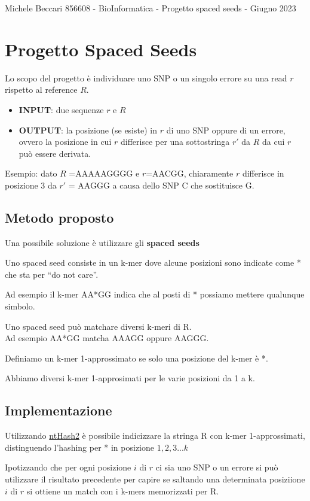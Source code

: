 \documentclass{article}
\begin{document}
	{Michele Beccari 856608 - BioInformatica -  Progetto spaced seeds - Giugno 2023} 
	
	\section{Progetto Spaced Seeds}

Lo scopo del progetto è individuare uno SNP o un singolo errore su una read $r$ rispetto al reference $R$.

\begin{itemize}
	\item \textbf{INPUT}: due sequenze $r$ e $R$
	\item \textbf{OUTPUT}: la posizione (se esiste) in $r$ di uno SNP oppure di un errore, ovvero la posizione in cui $r$ differisce per una sottostringa $r'$ da $R$ da cui $r$ può essere derivata. 
\end{itemize}

\begin{mdframed}[hidealllines=true,backgroundcolor=blue!20]
Esempio: dato $R$ =AAAAAGGGG e $r$=AACGG, chiaramente $r$ differisce in posizione 3 da $r'$ = AAGGG a causa dello SNP C che sostituisce G.
\end{mdframed} 

\subsection{Metodo proposto}
Una possibile soluzione è utilizzare gli \textbf{spaced seeds}

\begin{mdframed}[hidealllines=true,backgroundcolor=blue!20]
Uno spaced seed consiste in un k-mer dove alcune posizioni sono indicate come * che sta per “do not care”.
\end{mdframed} 

Ad esempio il k-mer AA*GG indica che al posti di * possiamo mettere qualunque simbolo.

Uno spaced seed può matchare diversi k-meri di R. \\
Ad esempio AA*GG matcha AAAGG oppure AAGGG.

\begin{mdframed}[hidealllines=true,backgroundcolor=blue!20]
Definiamo un k-mer 1-approssimato se solo una posizione del k-mer è *.
\end{mdframed}

Abbiamo diversi k-mer 1-approsimati per le varie posizioni da 1 a k.


\subsection{Implementazione}

Utilizzando  \href{https://github.com/bcgsc/ntHash}{ntHash2} è possibile indicizzare la stringa R con k-mer 1-approssimati, distinguendo l'hashing per * in posizione $1,2,3...k$


Ipotizzando che per ogni posizione $i$ di $r$ ci sia uno SNP o un errore si può utilizzare il risultato precedente per capire se saltando una determinata posiziione $i$ di $r$ si ottiene un match con i k-mers memorizzati per R.
\end{document}
